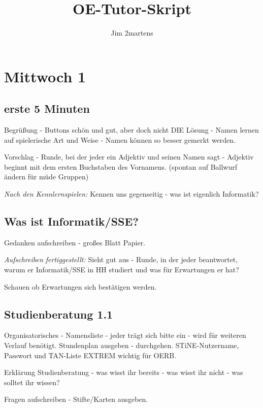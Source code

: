 \documentclass[10pt,a4paper,oneside,ngerman,numbers=noenddot]{scrartcl}
\begin{document}
\author{Jim 2martens}
\title{OE-Tutor-Skript}
\maketitle

\tableofcontents

\section{Mittwoch 1}

	\subsection{erste 5 Minuten}
	Begrüßung - Buttons schön und gut, aber doch nicht DIE Lösung - Namen lernen auf spielerische Art und Weise - Namen können so besser gemerkt werden.
	
	Vorschlag - Runde,  bei der jeder ein Adjektiv und seinen Namen sagt - Adjektiv beginnt mit dem ersten Buchstaben des Vornamens. (spontan auf Ballwurf ändern für müde Gruppen)
	
	\textit{Nach den Kennlernspielen:} Kennen uns gegenseitig - was ist eigenlich Informatik?
	
	\subsection{Was ist Informatik/SSE?}
	
	Gedanken aufschreiben - großes Blatt Papier. 
	
	\textit{Aufschreiben fertiggestellt:} Sieht gut aus - Runde, in der jeder beantwortet, warum er Informatik/SSE in HH studiert und was für Erwartungen er hat?
	
	Schauen ob Erwartungen sich bestätigen werden. 
	
	\subsection{Studienberatung 1.1}
	
	Organisatorisches - Namensliste - jeder trägt sich bitte ein - wird für weiteren Verlauf benötigt. Stundenplan ausgeben - durchgehen. STiNE-Nutzername, Passwort und TAN-Liste EXTREM wichtig für OERB.
	
	Erklärung Studienberatung - was wisst ihr bereits - was wisst ihr nicht - was solltet ihr wissen?
	
	Fragen aufschreiben - Stifte/Karten ausgeben.
	
\end{document}
